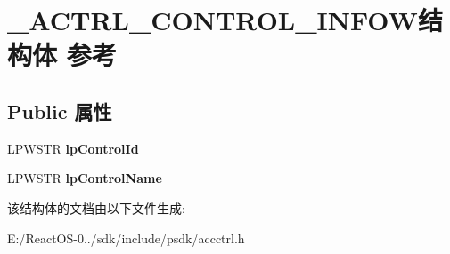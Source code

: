 \hypertarget{struct___a_c_t_r_l___c_o_n_t_r_o_l___i_n_f_o_w}{}\section{\+\_\+\+A\+C\+T\+R\+L\+\_\+\+C\+O\+N\+T\+R\+O\+L\+\_\+\+I\+N\+F\+O\+W结构体 参考}
\label{struct___a_c_t_r_l___c_o_n_t_r_o_l___i_n_f_o_w}
\subsection*{Public 属性}
\begin{DoxyCompactItemize}
\item 
\mbox{\label{struct___a_c_t_r_l___c_o_n_t_r_o_l___i_n_f_o_w_a1d7b7ab4bfbfbf14e5e8b754e6dbf30e}} 
L\+P\+W\+S\+TR {\bfseries lp\+Control\+Id}
\item 
\mbox{\label{struct___a_c_t_r_l___c_o_n_t_r_o_l___i_n_f_o_w_aa1cdd149abc21987bfd09861240e8862}} 
L\+P\+W\+S\+TR {\bfseries lp\+Control\+Name}
\end{DoxyCompactItemize}


该结构体的文档由以下文件生成\+:\begin{DoxyCompactItemize}
\item 
E\+:/\+React\+O\+S-\/0../sdk/include/psdk/accctrl.\+h\end{DoxyCompactItemize}
